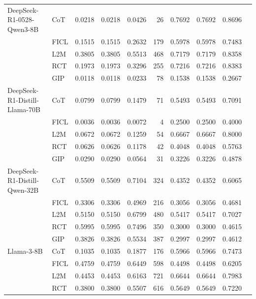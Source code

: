 \documentclass[conference]{IEEEtran}
\begin{document}
\begin{longtable}{p{3.5cm} l r r r r r r r r}
  \midrule
  \endfoot
DeepSeek-R1-0528-Qwen3-8B & CoT  & 0.0218 & 0.0218 & 0.0426 & 26 & 0.7692 & 0.7692 & 0.8696 \\
                          & FICL & 0.1515 & 0.1515 & 0.2632 & 179 & 0.5978 & 0.5978 & 0.7483 \\
                          & L2M  & 0.3805 & 0.3805 & 0.5513 & 468 & 0.7179 & 0.7179 & 0.8358 \\
                          & RCT  & 0.1973 & 0.1973 & 0.3296 & 255 & 0.7216 & 0.7216 & 0.8383 \\
                          & GIP  & 0.0118 & 0.0118 & 0.0233 & 78 & 0.1538 & 0.1538 & 0.2667 \\ \addlinespace
DeepSeek-R1-Distill-Llama-70B & CoT  & 0.0799 & 0.0799 & 0.1479 & 71 & 0.5493 & 0.5493 & 0.7091 \\
                          & FICL & 0.0036 & 0.0036 & 0.0072 & 4 & 0.2500 & 0.2500 & 0.4000 \\
                          & L2M  & 0.0672 & 0.0672 & 0.1259 & 54 & 0.6667 & 0.6667 & 0.8000 \\
                          & RCT  & 0.0626 & 0.0626 & 0.1178 & 42 & 0.4048 & 0.4048 & 0.5763 \\
                          & GIP  & 0.0290 & 0.0290 & 0.0564 & 31 & 0.3226 & 0.3226 & 0.4878 \\ \addlinespace
DeepSeek-R1-Distill-Qwen-32B & CoT  & 0.5509 & 0.5509 & 0.7104 & 324 & 0.4352 & 0.4352 & 0.6065 \\
                          & FICL & 0.3306 & 0.3306 & 0.4969 & 216 & 0.3056 & 0.3056 & 0.4681 \\
                          & L2M  & 0.5150 & 0.5150 & 0.6799 & 480 & 0.5417 & 0.5417 & 0.7027 \\
                          & RCT  & 0.5995 & 0.5995 & 0.7496 & 350 & 0.3000 & 0.3000 & 0.4615 \\
                          & GIP  & 0.3826 & 0.3826 & 0.5534 & 387 & 0.2997 & 0.2997 & 0.4612 \\ \addlinespace
Llama-3-8B & CoT  & 0.1035 & 0.1035 & 0.1877 & 176 & 0.5966 & 0.5966 & 0.7473 \\
           & FICL & 0.4759 & 0.4759 & 0.6449 & 598 & 0.4498 & 0.4498 & 0.6205 \\
           & L2M  & 0.4453 & 0.4453 & 0.6163 & 721 & 0.6644 & 0.6644 & 0.7983 \\
           & RCT  & 0.3800 & 0.3800 & 0.5507 & 616 & 0.5649 & 0.5649 & 0.7220 \\

\end{longtable}
\end{document}
